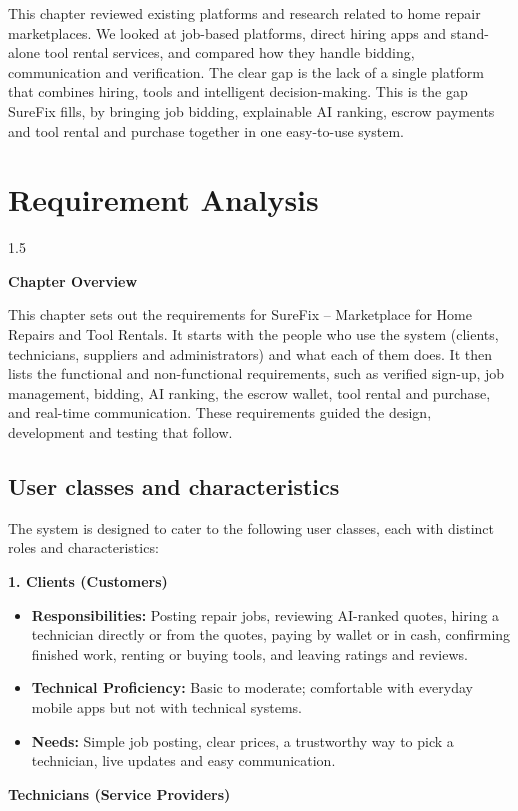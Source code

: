 \documentclass[A4paper,12pt]{report}
\theoremstyle{plain}
\theoremstyle{definition}
\theoremstyle{remark}
\numberwithin{equation}{section}
\begin{document}
This chapter reviewed existing platforms and research related to home repair marketplaces. We looked at job-based platforms, direct hiring apps and stand-alone tool rental services, and compared how they handle bidding, communication and verification. The clear gap is the lack of a single platform that combines hiring, tools and intelligent decision-making. This is the gap SureFix fills, by bringing job bidding, explainable AI ranking, escrow payments and tool rental and purchase together in one easy-to-use system.

\chapter{Requirement Analysis}
\thispagestyle{empty}
\newpage
\begin{spacing}{1.5}

\thispagestyle{empty}

{\centering \Large \bfseries Chapter Overview \par}
\vspace{1cm} %

This chapter sets out the requirements for SureFix – Marketplace for Home Repairs and Tool Rentals. It starts with the people who use the system (clients, technicians, suppliers and administrators) and what each of them does. It then lists the functional and non-functional requirements, such as verified sign-up, job management, bidding, AI ranking, the escrow wallet, tool rental and purchase, and real-time communication. These requirements guided the design, development and testing that follow.

\end{spacing}
\section{User classes and characteristics}
The system is designed to cater to the following user classes, each with distinct roles and characteristics:

\textbf{1. Clients (Customers)}

    \begin{itemize}
                \item \textbf{Responsibilities:} Posting repair jobs, reviewing AI-ranked quotes, hiring a technician directly or from the quotes, paying by wallet or in cash, confirming finished work, renting or buying tools, and leaving ratings and reviews.
        \item \textbf{Technical Proficiency:} Basic to moderate; comfortable with everyday mobile apps but not with technical systems.
        \item \textbf{ Needs:} Simple job posting, clear prices, a trustworthy way to pick a technician, live updates and easy communication.
        
    \end{itemize}
\textbf{Technicians (Service Providers)}
\end{document}
